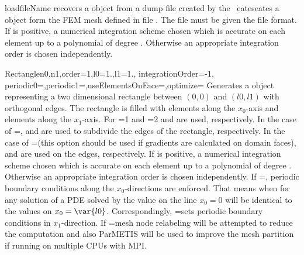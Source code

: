 \begin{funcdesc}{load}{fileName}
recovers a \Domain object from a dump file created by the \ 
eateseates a \Domain object form the FEM mesh defined in 
file . The file must be given the \finley file format.
If \var{integrationOrder} is positive, a numerical integration scheme
chosen which is accurate on each element up to a polynomial of
degree  . Otherwise
an appropriate integration order is chosen independently.
\end{funcdesc}

\begin{funcdesc}{Rectangle}{n0,n1,order=1,l0=1.,l1=1., integrationOrder=-1, \\
  periodic0=\False,periodic1=\False,useElementsOnFace=\False,optimize=\False}
Generates a \Domain object representing a two dimensional rectangle between
$(0,0)$ and $(l0,l1)$ with orthogonal edges. The rectangle is filled with
\var{n0} elements along the $x_0$-axis and
 elements along the $x_1$-axis. 
For =1 and \var{order}=2
 and  
 are used, respectively. 
In the case of =\False,
 and  
 are used to subdivide the edges of the rectangle, respectively. 
In the case of \var{useElementsOnFace}=\True (this option should be used if gradients
are calculated on domain faces),
 and  
 are used on the edges, respectively.  
If  is positive, a numerical integration scheme
chosen which is accurate on each element up to a polynomial of
degree  . Otherwise
an appropriate integration order is chosen independently. If
=\True, periodic boundary conditions 
along the $x_0$-directions are enforced. That means when for any solution of a PDE solved by \finley
the value on the line $x_0=0$ will be identical to the values on $x_0=\var{l0}$.
Correspondingly,
=\False sets periodic boundary conditions
in $x_1$-direction.
If =\True mesh node relabeling will be attempted to reduce the computation and also ParMETIS will be used to improve the mesh partition if running on multiple CPUs with MPI.
\end{funcdesc}

